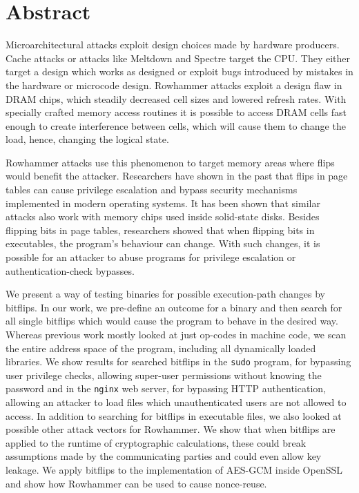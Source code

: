 
{}
\chapter*{Abstract}
\label{cha:abstract}

Microarchitectural attacks exploit design choices made by hardware producers.
Cache attacks or attacks like Meltdown and Spectre target the CPU. They either
target a design which works as designed or exploit bugs introduced by mistakes
in the hardware or microcode design. Rowhammer attacks exploit a design flaw in
DRAM chips, which steadily decreased cell sizes and lowered refresh rates. With
specially crafted memory access routines it is possible to access DRAM cells
fast enough to create interference between cells, which will cause them to
change the load, hence, changing the logical state.

Rowhammer attacks use this phenomenon to target memory areas where flips would
benefit the attacker. Researchers have shown in the past that flips in page
tables can cause privilege escalation and bypass security mechanisms implemented
in modern operating systems. It has been shown that similar attacks also work
with memory chips used inside solid-state disks. Besides flipping bits in page
tables, researchers showed that when flipping bits in executables, the program's
behaviour can change. With such changes, it is possible for an attacker to abuse
programs for privilege escalation or authentication-check bypasses.

We present a way of testing binaries for possible execution-path changes by
bitflips. In our work, we pre-define an outcome for a binary and then search for
all single bitflips which would cause the program to behave in the desired way.
Whereas previous work mostly looked at just op-codes in machine code, we scan
the entire address space of the program, including all dynamically loaded
libraries. We show results for searched bitflips in the \texttt{sudo} program,
for bypassing user privilege checks, allowing super-user permissions without
knowing the password and in the \texttt{nginx} web server, for bypassing HTTP
authentication, allowing an attacker to load files which unauthenticated users
are not allowed to access. In addition to searching for bitflips in executable
files, we also looked at possible other attack vectors for Rowhammer. We show
that when bitflips are applied to the runtime of cryptographic calculations,
these could break assumptions made by the communicating parties and could even
allow key leakage. We apply bitflips to the implementation of AES-GCM inside
OpenSSL and show how Rowhammer can be used to cause nonce-reuse.

